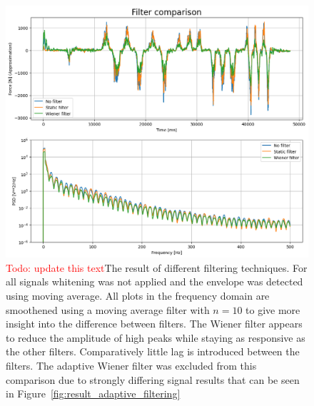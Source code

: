 \begin{figure}[h!t]
	\begin{center}
		\includegraphics[width=1.0\columnwidth]{images/measurement_filtering.png}
	\end{center}
	\caption{\textcolor{red}{Todo: update this text}The result of different filtering techniques. For all signals whitening was not applied and the envelope was detected using moving average. All plots in the frequency domain are smoothened using a moving average filter with $n=10$ to give more insight into the difference between filters. The Wiener filter appears to reduce the amplitude of high peaks while staying as responsive as the other filters. Comparatively little lag is introduced between the filters. The adaptive Wiener filter was excluded from this comparison due to strongly differing signal results that can be seen in Figure~\ref{fig:result_adaptive_filtering}}
	\label{fig:result_filtering}
\end{figure}


